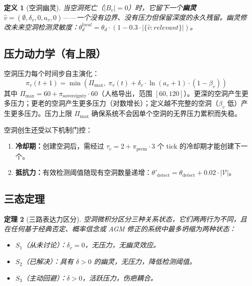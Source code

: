 \documentclass[11pt]{article}
\newtheorem{theorem}{定理}[section]
\newtheorem{definition}[theorem]{定义}
\begin{document}
\begin{definition}[空洞幽灵]
\label{def:ghost}
当空洞死亡（$|B_v| = 0$）时，它留下一个\textbf{幽灵} $\hat{v} = (\emptyset, \delta_v, 0, a_v, 0)$——一个没有边界、没有压力但保留深度的永久残留。幽灵修改未来空洞检测灵敏度：$\theta_d^{local} = \theta_d \cdot (1 - 0.3 \cdot |\{\hat{v}: relevant\}|)$。
\end{definition}

\subsection{压力动力学（有上限）}

空洞压力每个时间步自主演化：
\begin{equation}
\label{eq:pressure}
\pi_v(t+1) = \min\!\left(\Pi_{\max},\; \pi_v(t) + \delta_v \cdot \ln(a_v + 1) \cdot (1 - \beta_v)\right)
\end{equation}
其中 $\Pi_{\max} = 60 + \pi_{\text{sovereignty}} \cdot 60$（人格导出，范围 $[60, 120]$）。更深的空洞产生更多压力；更老的空洞产生更多压力（对数增长）；定义越不完整的空洞（$\beta_v$ 低）产生更多压力。压力上限 $\Pi_{\max}$ 确保系统不会因单个空洞的无界压力累积而失稳。

空洞创生还受以下机制门控：
\begin{enumerate}
\item \textbf{冷却期：}创建空洞后，需经过 $\tau_c = 2 + \pi_{\text{perm}} \cdot 3$ 个 tick 的冷却期才能创建下一个。
\item \textbf{抵抗力：}有效检测阈值随现有空洞数量递增：$\theta'_{\text{detect}} = \theta_{\text{detect}} + 0.02 \cdot |\mathcal{V}|$。
\end{enumerate}

\subsection{三态定理}

\begin{theorem}[三路表达力区分]
\label{thm:void-three-way}
空洞微积分区分三种关系状态，它们两两行为不同，且在任何基于经典否定、概率信念或 AGM 修正的系统中最多坍缩为两种状态：
\begin{itemize}
\item $S_1$（从未讨论）：$\delta_v = 0$，无压力，无幽灵效应。
\item $S_2$（已解决）：具有 $\delta > 0$ 的幽灵，无压力，降低检测阈值。
\item $S_3$（主动回避）：$\delta > 0$，活跃压力，伤疤耦合。
\end{itemize}
\end{theorem}
\end{document}
